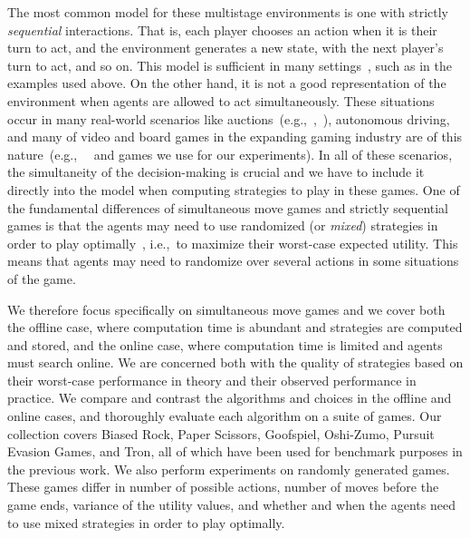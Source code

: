 \documentclass[preprint,12pt]{elsarticle}
\newcommand{\eg}{{e.g.,}~}
\newcommand{\ie}{{i.e.,}~}
\newcommand{\reviewchange}[1]{{\color{blue}#1}}
\begin{document}
The most common model for these multistage environments is one with strictly {\it sequential}
interactions. That is, each player chooses an action when it is their turn to act, and the environment
generates a new state, with the next player's turn to act, and so on. This model is sufficient in many
settings~\cite{AIbook}, such as in the examples used above.
\reviewchange{On the other hand, it is not a good representation of the environment when agents are allowed to act simultaneously.
These situations occur in many real-world scenarios like auctions~(\eg,~\cite{Keuter1997}), autonomous driving, and many of video and board games in the expanding gaming industry are of this nature~(\eg~\cite{Beard12Using,Teytaud11Upper} and games we use for our experiments).
In all of these scenarios, the simultaneity of the decision-making is crucial and we have to include it directly into the model when computing strategies to play in these games.}
One of the fundamental differences of simultaneous move games and strictly sequential
games is that the agents may need to use randomized (or \textit{mixed}) strategies in order to
play optimally~\cite{Gintis09},
\ie to maximize their worst-case expected utility.
This means that agents may need to randomize over several actions in some situations of the game.

\reviewchange{We therefore focus specifically on simultaneous move games and} we cover both the offline case, where computation time is
abundant and strategies are computed and stored, and the online case, where computation time is limited and
agents must search online. We are concerned both with the quality of strategies based on
their worst-case performance in theory and their observed performance in practice. We compare and
contrast the algorithms and choices in the offline and online cases, and thoroughly evaluate each
algorithm on a suite of games. Our collection covers Biased Rock, Paper Scissors, Goofspiel, Oshi-Zumo,
Pursuit Evasion Games, and Tron, all of which have been used for benchmark purposes
in the previous work. We also perform experiments on randomly generated games. These games differ
in number of possible actions, number of moves before the game ends, variance of the utility values,
and whether and when the agents need to use mixed strategies in order to play optimally.
\end{document}
